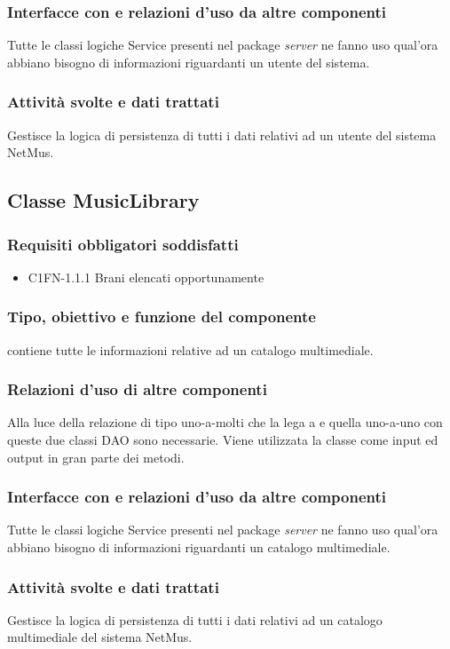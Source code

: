 \subsubsection*{Interfacce con e relazioni d'uso da altre componenti}
Tutte le classi logiche Service presenti nel package \emph{server} ne fanno uso
qual'ora abbiano bisogno di informazioni riguardanti un utente del sistema.
\subsubsection*{Attivit\`a svolte e dati trattati}
Gestisce la logica di persistenza di tutti i dati relativi ad un utente del
sistema NetMus.

\subsection{Classe MusicLibrary}
\subsubsection*{Requisiti obbligatori soddisfatti}
\begin{itemize}
	\item C1FN-1.1.1 Brani elencati opportunamente
\end{itemize}
\subsubsection*{Tipo, obiettivo e funzione del componente} 
contiene tutte le informazioni relative ad un catalogo multimediale.
\subsubsection*{Relazioni d'uso di altre componenti} Alla luce della relazione
di tipo uno-a-molti che la lega a  e quella uno-a-uno con
 queste due classi DAO sono necessarie. Viene utilizzata la
classe  come input ed output in gran parte dei metodi.
\subsubsection*{Interfacce con e relazioni d'uso da altre componenti} Tutte le
classi logiche Service presenti nel package \emph{server} ne fanno uso qual'ora
abbiano bisogno di informazioni riguardanti un catalogo multimediale.
\subsubsection*{Attivit\`a svolte e dati trattati} Gestisce la logica di
persistenza di tutti i dati relativi ad un catalogo multimediale del sistema
NetMus.

